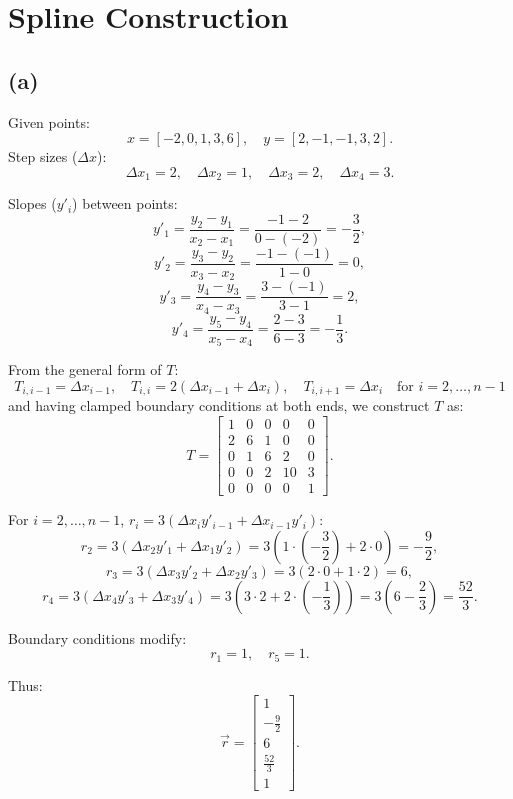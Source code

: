 \documentclass{article}
\begin{document}
\newpage
\section{Spline Construction}
\subsection*{(a)}
Given points:
$$
    x = [-2, 0, 1, 3, 6], \quad y = [2, -1, -1, 3, 2].
$$
Step sizes ($\Delta x$):
$$
    \Delta x_1 = 2, \quad \Delta x_2 = 1, \quad \Delta x_3 = 2, \quad \Delta x_4 = 3.
$$

Slopes ($y'_i$) between points:
$$
    y'_1 = \frac{y_2 - y_1}{x_2 - x_1} = \frac{-1 - 2}{0 - (-2)} = -\frac{3}{2},
$$
$$
    y'_2 = \frac{y_3 - y_2}{x_3 - x_2} = \frac{-1 - (-1)}{1 - 0} = 0,
$$
$$
    y'_3 = \frac{y_4 - y_3}{x_4 - x_3} = \frac{3 - (-1)}{3 - 1} = 2,
$$
$$
    y'_4 = \frac{y_5 - y_4}{x_5 - x_4} = \frac{2 - 3}{6 - 3} = -\frac{1}{3}.
$$

From the general form of $T$:
$$
    T_{i, i-1} = \Delta x_{i-1}, \quad T_{i, i} = 2(\Delta x_{i-1} + \Delta x_i), \quad T_{i, i+1} = \Delta x_i \quad \text{for }i=2,\dots,n-1
$$
and having clamped boundary conditions at both
ends, we construct $T$ as:
$$
    T =
    \begin{bmatrix}
        1 & 0 & 0 & 0  & 0 \\
        2 & 6 & 1 & 0  & 0 \\
        0 & 1 & 6 & 2  & 0 \\
        0 & 0 & 2 & 10 & 3 \\
        0 & 0 & 0 & 0  & 1
    \end{bmatrix}.
$$

For $i = 2, \dots, n-1$, $r_i = 3(\Delta x_i y'_{i-1} + \Delta x_{i-1} y'_i)$:
$$
    r_2 = 3(\Delta x_2 y'_1 + \Delta x_1 y'_2) = 3(1 \cdot (-\frac{3}{2}) + 2 \cdot 0) = -\frac{9}{2},
$$
$$
    r_3 = 3(\Delta x_3 y'_2 + \Delta x_2 y'_3) = 3(2 \cdot 0 + 1 \cdot 2) = 6,
$$
$$
    r_4 = 3(\Delta x_4 y'_3 + \Delta x_3 y'_4) = 3(3 \cdot 2 + 2 \cdot (-\frac{1}{3})) = 3(6 - \frac{2}{3}) = \frac{52}{3}.
$$

Boundary conditions modify:
$$
    r_1 = 1, \quad r_5 = 1.
$$

Thus:
$$
    \vec{r} = \begin{bmatrix}
        1            \\
        -\frac{9}{2} \\
        6            \\
        \frac{52}{3} \\
        1
    \end{bmatrix}.
$$
\end{document}
